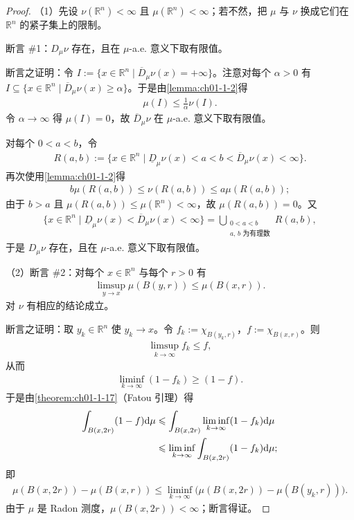 \documentclass[../../main.tex]{subfiles}%
\begin{document}
\begin{proof}
（1）先设 $\nu(\mathbb{R}^n)<\infty$ 且 $\mu(\mathbb{R}^n)<\infty$；若不然，把 $\mu$ 与 $\nu$ 换成它们在 $\mathbb{R}^n$ 的紧子集上的限制。

断言 \#1：$D_{\mu}\nu$ 存在，且在 $\mu$-a.e. 意义下取有限值。

断言之证明：令 $I:=\{x\in\mathbb{R}^n\mid\overline{D}_{\mu}\nu(x)=+\infty\}$。注意对每个 $\alpha>0$ 有 $I\subseteq\{x\in\mathbb{R}^n\mid\overline{D}_{\mu}\nu(x)\geqslant\alpha\}$。于是由\cref{lemma:ch01-1-2}得%
\begin{align*}
\mu(I)\leqslant\frac{1}{\alpha}\nu(I).
\end{align*}
令 $\alpha\to\infty$ 得 $\mu(I)=0$，故 $\overline{D}_{\mu}\nu$ 在 $\mu$-a.e. 意义下取有限值。

对每个 $0<a<b$，令
\begin{align*}
R(a,b):=\{x\in\mathbb{R}^n\mid\underline{D}_{\mu}\nu(x)<a<b<\overline{D}_{\mu}\nu(x)<\infty\}.
\end{align*}
再次使用\cref{lemma:ch01-1-2}得%
\begin{align*}
b\mu(R(a,b))\leqslant\nu(R(a,b))\leqslant a\mu(R(a,b));
\end{align*}
由于 $b>a$ 且 $\mu(R(a,b))\leqslant\mu(\mathbb{R}^n)<\infty$，故 $\mu(R(a,b))=0$。又
\begin{align*}
\{x\in\mathbb{R}^n\mid\underline{D}_{\mu}\nu(x)<\overline{D}_{\mu}\nu(x)<\infty\}
=\bigcup_{\substack{0<a<b\\ a,\,b\text{ 为有理数}}}R(a,b),
\end{align*}
于是 $D_{\mu}\nu$ 存在，且在 $\mu$-a.e. 意义下取有限值。

（2）断言 \#2：对每个 $x\in\mathbb{R}^n$ 与每个 $r>0$ 有
\begin{align*}
\limsup_{y\to x}\mu(B(y,r))\leqslant\mu(B(x,r)).
\end{align*}
对 $\nu$ 有相应的结论成立。

断言之证明：取 $y_k\in\mathbb{R}^n$ 使 $y_k\to x$。令 $f_k:=\chi_{B(y_k,r)}$，$f:=\chi_{B(x,r)}$。则
\begin{align*}
\limsup_{k\to\infty}f_k\leqslant f,
\end{align*}
从而
\begin{align*}
\liminf_{k\to\infty}(1-f_k)\geqslant(1-f).
\end{align*}
于是由\cref{theorem:ch01-1-17}（Fatou 引理）得%
\begin{align*}
\int_{B(x,2r)}(1-f)\mathrm{d}\mu
&\leqslant\int_{B(x,2r)}\liminf_{k\to\infty}(1-f_k)\mathrm{d}\mu\\
&\leqslant\liminf_{k\to\infty}\int_{B(x,2r)}(1-f_k)\mathrm{d}\mu;
\end{align*}
即
\begin{align*}
\mu(B(x,2r))-\mu(B(x,r))\leqslant\liminf_{k\to\infty}\bigl(\mu(B(x,2r))-\mu(B(y_k,r))\bigr).
\end{align*}
由于 $\mu$ 是 Radon 测度，$\mu(B(x,2r))<\infty$；断言得证。


\end{proof}
\end{document}
